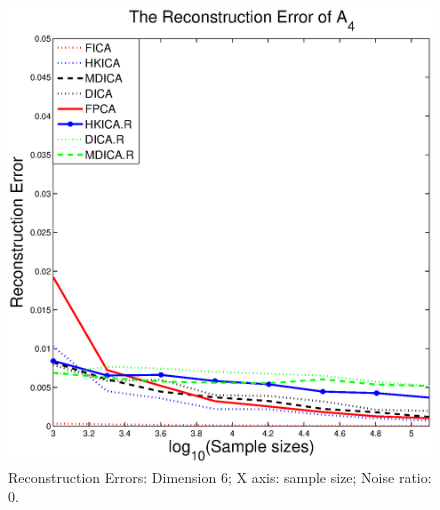 \begin{figure}[t]
	\includegraphics[width =0.45\columnwidth]{error4_sample_noise0}
\caption{
\label{fig:Error_sample_noise0}
 Reconstruction Errors: Dimension 6; X axis: sample size; Noise ratio: 0.}
\end{figure}


